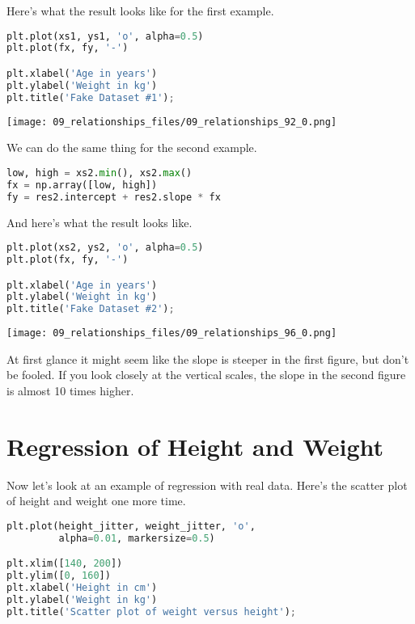 Here's what the result looks like for the first example.

\begin{lstlisting}[language=Python,style=source]
plt.plot(xs1, ys1, 'o', alpha=0.5)
plt.plot(fx, fy, '-')

plt.xlabel('Age in years')
plt.ylabel('Weight in kg')
plt.title('Fake Dataset #1');
\end{lstlisting}

\begin{center}
\texttt{[image: 09\_relationships\_files/09\_relationships\_92\_0.png]}
\end{center}

We can do the same thing for the second example.

\begin{lstlisting}[language=Python,style=source]
low, high = xs2.min(), xs2.max()
fx = np.array([low, high])
fy = res2.intercept + res2.slope * fx
\end{lstlisting}

And here's what the result looks like.

\begin{lstlisting}[language=Python,style=source]
plt.plot(xs2, ys2, 'o', alpha=0.5)
plt.plot(fx, fy, '-')

plt.xlabel('Age in years')
plt.ylabel('Weight in kg')
plt.title('Fake Dataset #2');
\end{lstlisting}

\begin{center}
\texttt{[image: 09\_relationships\_files/09\_relationships\_96\_0.png]}
\end{center}

At first glance it might seem like the slope is steeper in the first
figure, but don't be fooled. If you look closely at the vertical scales,
the slope in the second figure is almost 10 times higher.

\section{Regression of Height and
Weight}\label{regression-of-height-and-weight}

Now let's look at an example of regression with real data. Here's the
scatter plot of height and weight one more time.

\begin{lstlisting}[language=Python,style=source]
plt.plot(height_jitter, weight_jitter, 'o', 
         alpha=0.01, markersize=0.5)

plt.xlim([140, 200])
plt.ylim([0, 160])
plt.xlabel('Height in cm')
plt.ylabel('Weight in kg')
plt.title('Scatter plot of weight versus height');
\end{lstlisting}

